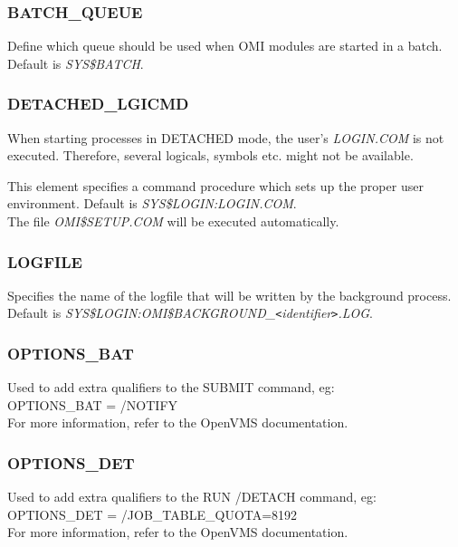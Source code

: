 \documentclass[a4paper]{book}
\newcommand{\lt}{\texttt{<}}
\newcommand{\gt}{\texttt{>}}
\renewcommand{\indent}{\hspace*{5mm}}
\begin{document}
\subsubsection{BATCH{\_}QUEUE}

Define which queue should be used when OMI modules are started in a batch. 
Default is \textsl{SYS{\$}BATCH}.

\subsubsection{DETACHED{\_}LGICMD}

When starting processes in DETACHED mode, the user's \textsl{LOGIN.COM} is 
not executed. Therefore, several logicals, symbols etc. might not be 
available.

This element specifies a command procedure which sets up the proper user 
environment. Default is \textsl{SYS{\$}LOGIN:LOGIN.COM}. \\
The file \textsl{OMI{\$}SETUP.COM} will be executed automatically.

\subsubsection{LOGFILE}

Specifies the name of the logfile that will be written by the background 
process. Default is 
\textsl{SYS{\$}LOGIN:OMI{\$}BACKGROUND{\_}\textit{\lt identifier\gt }.LOG}.

\subsubsection{OPTIONS{\_}BAT}

Used to add extra qualifiers to the \textsf{SUBMIT} command, eg:\\
\indent\textsf{OPTIONS{\_}BAT = /NOTIFY} \\
For more information, refer to the OpenVMS documentation.

\subsubsection{OPTIONS{\_}DET}

Used to add extra qualifiers to the \textsf{RUN /DETACH} command, eg:\\
\indent\textsf{OPTIONS{\_}DET = /JOB{\_}TABLE{\_}QUOTA=8192} \\
For more information, refer to the OpenVMS documentation.
\end{document}
